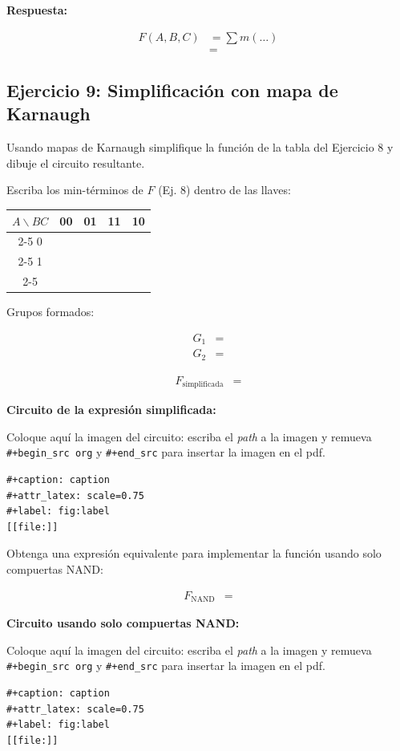 \documentclass[11pt]{article}
\makeatletter
\newcommand{\kc}[2]{\makebox[1.2cm][c]{\rule[-0.55cm]{0pt}{1.2cm}\in@{,#1,}{,#2,}\ifin@ 1\else 0\fi}}
\newcommand{\kmapthree}[1]{\begin{center}\begin{tabular}{c|*{4}{c|}}\multicolumn{1}{c}{$A\backslash BC$}&\multicolumn{1}{c}{00}&\multicolumn{1}{c}{01}&\multicolumn{1}{c}{11}&\multicolumn{1}{c}{10}\\\cline{2-5} 0&\kc{0}{#1}&\kc{1}{#1}&\kc{3}{#1}&\kc{2}{#1}\\\cline{2-5} 1&\kc{4}{#1}&\kc{5}{#1}&\kc{7}{#1}&\kc{6}{#1}\\\cline{2-5}\end{tabular}\end{center}}
\makeatother
\begin{document}
\textbf{Respuesta:}

\begin{align*}
  F(A,B,C) &= \sum m(\ldots) \\
           &=
\end{align*}

\subsection{Ejercicio 9: Simplificación con mapa de Karnaugh}
\label{sec:org257612e}
Usando mapas de Karnaugh simplifique la función de la tabla del
Ejercicio 8 y dibuje el circuito resultante.

Escriba los min-términos de \(F\) (Ej. 8) dentro de las llaves:

\kmapthree{}

Grupos formados:

\begin{align*}
  G_1 &= \\
  G_2 &=
\end{align*}

\begin{align*}
  F_{\text{simplificada}} &=
\end{align*}

\textbf{Circuito de la expresión simplificada:}

Coloque aquí la imagen del circuito: escriba el  \emph{path} a la imagen y
remueva \texttt{\#+begin\_src org} y \texttt{\#+end\_src} para insertar la imagen en el pdf. 

\begin{verbatim}
#+caption: caption
#+attr_latex: scale=0.75
#+label: fig:label
[[file:]]
\end{verbatim}

Obtenga una expresión equivalente para implementar la función usando
solo compuertas NAND:

\begin{align*}
  F_{\text{NAND}} &=
\end{align*}

\textbf{Circuito usando solo compuertas NAND:}

Coloque aquí la imagen del circuito: escriba el  \emph{path} a la imagen y
remueva \texttt{\#+begin\_src org} y \texttt{\#+end\_src} para insertar la imagen en el pdf. 

\begin{verbatim}
#+caption: caption
#+attr_latex: scale=0.75
#+label: fig:label
[[file:]]
\end{verbatim}
\end{document}
